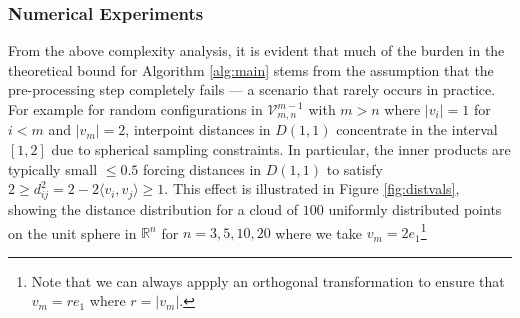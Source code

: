 \documentclass{article}
\theoremstyle{definition}
\renewcommand{\r}{\mathbb{R}}
\newcommand{\ip}[2]{\langle {#1}, {#2} \rangle}
\renewcommand{\|}{|}
\newcommand{\V}{\mathcal{V}}
\begin{document}
\subsubsection{Numerical Experiments}

From the above complexity analysis, it is evident that much of the burden in the theoretical bound for Algorithm \ref{alg:main} stems from the assumption that the pre-processing step completely fails — a scenario that rarely occurs in practice. For example
for random configurations in $\V^{m-1}_{m,n}$ with $m>n$ where $|v_i| = 1$ for $i < m$ and $|v_{m}| = 2$, interpoint distances in $D(1,1)$ concentrate in the interval $[1,2]$ due to spherical sampling constraints. In particular, the inner products are typically small $\leq 0.5$ forcing distances in $D(1,1)$ to satisfy $2 \geq d_{ij}^2 = 2 - 2\ip{v_i}{v_j} \geq 1$. This effect is illustrated in Figure \ref{fig:distvals}, showing the distance distribution for a cloud of $100$ uniformly distributed points on the unit sphere in $\r^n$ for $n=3,5,10,20$ where we take $v_m = 2e_1$\footnote{Note
that we can always appply an orthogonal transformation to ensure that $v_m = r e_1$ where $r= |v_m|$.} 
\end{document}
